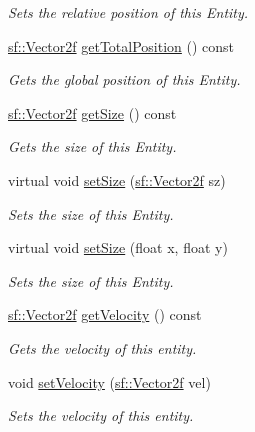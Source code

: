 \begin{DoxyCompactItemize}
\begin{DoxyCompactList}\small\item\em Sets the relative position of this Entity. \end{DoxyCompactList}\item 
\mbox{\hyperlink{classsf_1_1_vector2}{sf\+::\+Vector2f}} \mbox{\hyperlink{class_game_entity_a943f5b9f20bd540c273f2570c4d238c6}{get\+Total\+Position}} () const
\begin{DoxyCompactList}\small\item\em Gets the global position of this Entity. \end{DoxyCompactList}\item 
\mbox{\hyperlink{classsf_1_1_vector2}{sf\+::\+Vector2f}} \mbox{\hyperlink{class_game_entity_a567bab0fe1e2c3dd98fa031d2e5df14e}{get\+Size}} () const
\begin{DoxyCompactList}\small\item\em Gets the size of this Entity. \end{DoxyCompactList}\item 
virtual void \mbox{\hyperlink{class_game_entity_a9427be562b5a8e7a41d5f4a9b7075293}{set\+Size}} (\mbox{\hyperlink{classsf_1_1_vector2}{sf\+::\+Vector2f}} sz)
\begin{DoxyCompactList}\small\item\em Sets the size of this Entity. \end{DoxyCompactList}\item 
virtual void \mbox{\hyperlink{class_game_entity_a32ebd1840e528355e79e0302022ea9a0}{set\+Size}} (float x, float y)
\begin{DoxyCompactList}\small\item\em Sets the size of this Entity. \end{DoxyCompactList}\item 
\mbox{\hyperlink{classsf_1_1_vector2}{sf\+::\+Vector2f}} \mbox{\hyperlink{class_game_entity_afe5c1a38c4546dfda67458f852e89d92}{get\+Velocity}} () const
\begin{DoxyCompactList}\small\item\em Gets the velocity of this entity. \end{DoxyCompactList}\item 
void \mbox{\hyperlink{class_game_entity_a885228ed385f80fe243f3d9d337d52a0}{set\+Velocity}} (\mbox{\hyperlink{classsf_1_1_vector2}{sf\+::\+Vector2f}} vel)
\begin{DoxyCompactList}\small\item\em Sets the velocity of this entity. \end{DoxyCompactList}\item 

\end{DoxyCompactItemize}
